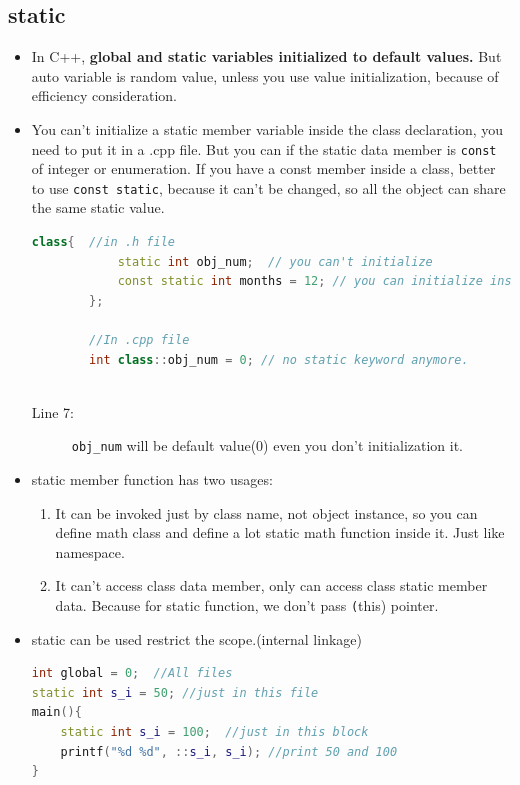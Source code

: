 \documentclass[a4paper,11pt,twoside]{book}
\begin{document}
\subsection{static}
\begin{itemize}
	\item In C++, \textbf{global and static variables initialized to default values.}  But auto variable is random value, unless you use value initialization, because of efficiency consideration. 
	
	\item You can't initialize a static member variable inside the class declaration, you need to put it in a .cpp file.   But you can if the static data member is \texttt{const} of integer or enumeration. If you have a const member inside a class, better to use \texttt{const static}, because it can't be changed, so all the object can share the same static value.
	\begin{lstlisting}[frame=single, language=c++]
		class{  //in .h file
			static int obj_num;  // you can't initialize
			const static int months = 12; // you can initialize inside the class
		};
		
		//In .cpp file
		int class::obj_num = 0; // no static keyword anymore.
		
	\end{lstlisting}
	\begin{description}
		\item[Line 7:] \texttt{obj\_num} will be default value(0) even you don't initialization it.
	\end{description}
	
	\item static member function has two usages:
	\begin{enumerate}
		\item It can be invoked just by class name, not object instance, so you can define math class and define a lot static math function inside it.  Just like namespace.
		
		\item It can't access class data member, only can access class static member data. Because for static function, we don't pass \texttt(this) pointer.
	\end{enumerate}
	
	\item static can be used restrict the scope.(internal linkage)
\begin{lstlisting}[frame=single, language=c++]
int global = 0;  //All files
static int s_i = 50; //just in this file
main(){
	static int s_i = 100;  //just in this block
	printf("%d %d", ::s_i, s_i); //print 50 and 100
}
\end{lstlisting}
	\begin{description}
		

\end{description}
\end{itemize}
\end{document}
